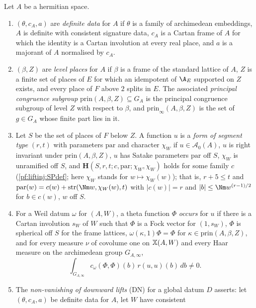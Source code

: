 \begin{definition}\label{pf:liftinj:Defdef}
Let $A$ be a hermitian space.
\begin{enumerate}[label=(\alph*)]
\item $(\theta,c_A,a)$ are \emph{definite data} for $A$ if $\theta$ is a family of archimedean embeddings, $A$ is definite with consistent
signature data, $c_A$ is a Cartan frame of $A$ for which the identity is a Cartan involution at every real place, and $a$ is a majorant of $A$
normalised by $c_A$.
\item $(\beta,Z)$ are \emph{level places} for $A$ if $\beta$ is a frame of the standard lattice of $A$, $Z$ is a finite set of places of $E$ for which an
idempotent of $\A_E$ supported on $Z$ exists, and every place of $F$ above $2$ splits in $E$. The associated \emph{principal congruence subgroup}
$\mathrm{prin}(A,\beta,Z)\subseteq G_A$ is the principal congruence subgroup of level $Z$ with respect to $\beta$, and $\mathrm{prin}_\infty(A,\beta,Z)$
is the set of $g\in G_A$ whose finite part lies in it.
\item Let $S$ be the set of places of $F$ below $Z$. A function $u$ is a \emph{form of segment type} $(r,t)$ with parameters $\mathrm{par}$ and
character $\chi_W$ if $u\in\mathcal A_0(A)$, $u$ is right invariant under $\mathrm{prin}(A,\beta,Z)$, $u$ has Satake parameters $\mathrm{par}$ off $S$,
$\chi_W$ is unramified off $S$, and $\mathbf H(S,r,t;c,\mathrm{par};\chi_W,\chi_W)$ holds for some family $c$ (\cref{pf:liftinj:SPdef}; here $\chi_W$
stands for $w\mapsto\chi_W(w)$); that is, $r+5\le t$ and $\mathrm{par}(w)=c(w)+\liftinjstr(\Nm w,\chi_W(w),t)$ with $|c(w)|=r$ and
$|b|\le\Nm w^{(r-1)/2}$ for $b\in c(w)$, $w$ off $S$.
\item For a Weil datum $\omega$ for $(A,W)$, a theta function $\Phi$ \emph{occurs} for $u$ if there is a Cartan involution $s_W$ of $W$ such that $\Phi$
is a Fock vector for $(1,s_W)$, $\Phi$ is spherical off $S$ for the frame lattices, $\omega(\kappa,1)\Phi=\Phi$ for $\kappa\in\mathrm{prin}(A,\beta,Z)$, and
for every measure $\nu$ of covolume one on $\mathbb{X}(A,W)$ and every Haar measure on the archimedean group $G_{A,\infty}$,
\begin{equation}\label{eq:pf:liftinj:realint}
\int_{G_{A,\infty}}c_\omega(\Phi,\Phi)(b)\,r(u,u)(b)\,db\ne0 .
\end{equation}
\item The \emph{non-vanishing of downward lifts} (DN) for a global datum $D$ asserts: let $(\theta,c_A,a)$ be definite data for $A$, let $W$ have consistent

\end{enumerate}
\end{definition}
